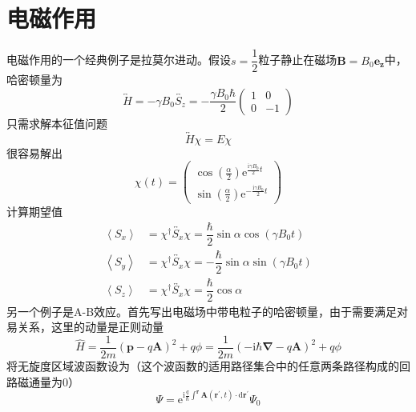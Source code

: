 \documentclass[12pt, a4paper, oneside]{ctexart}
\begin{document}
	\section{电磁作用}
	电磁作用的一个经典例子是拉莫尔进动。假设$s=\dfrac{1}{2}$粒子静止在磁场$\boldsymbol{B}=B_{0}\boldsymbol{e_{z}}$中，哈密顿量为
	\begin{equation}
		\overleftrightarrow{H}=-\gamma B_{0}\overleftrightarrow{S_{z}}=-\dfrac{\gamma B_{0}\hbar}{2}\begin{pmatrix}
			1	& 0\\
			0	&-1
		\end{pmatrix}
	\end{equation}
	\quad\quad 只需求解本征值问题
	\begin{equation}
		\overleftrightarrow{H}\chi=E\chi
	\end{equation}
	\quad\quad 很容易解出
	\begin{equation}
		\chi(t)=\begin{pmatrix}
		\cos(\frac{\alpha}{2})\mathrm{e}^{\frac{\mathrm{i}\gamma B_{0}}{2}t}	\\\sin(\frac{\alpha}{2})\mathrm{e}^{-\frac{\mathrm{i}\gamma B_{0}}{2}t}
		\end{pmatrix}
	\end{equation}
	\quad\quad 计算期望值
	\begin{align}
		\left<S_{x}\right>&=\chi^{\dagger}\overleftrightarrow{S_{x}}\chi=\dfrac{\hbar}{2}\sin\alpha\cos\left(\gamma B_{0}t\right)\\
		\left<S_{y}\right>&=\chi^{\dagger}\overleftrightarrow{S_{x}}\chi=-\dfrac{\hbar}{2}\sin\alpha\sin\left(\gamma B_{0}t\right)\\
		\left<S_{z}\right>&=\chi^{\dagger}\overleftrightarrow{S_{x}}\chi=\dfrac{\hbar}{2}\cos\alpha
	\end{align}
	\quad\quad 另一个例子是A-B效应。首先写出电磁场中带电粒子的哈密顿量，由于需要满足对易关系，这里的动量是正则动量
	\begin{equation}
		\hat{H}=\dfrac{1}{2m}\left(\boldsymbol{p}-q\boldsymbol{A}\right)^{2}+q\phi=\dfrac{1}{2m}\left(-\mathrm{i}\hbar\boldsymbol{\nabla}-q\boldsymbol{A}\right)^{2}+q\phi
	\end{equation}
	\quad\quad 将无旋度区域波函数设为（这个波函数的适用路径集合中的任意两条路径构成的回路磁通量为$0$）
	\begin{equation}
		\Psi=\mathrm{e}^{\mathrm{i}\frac{q}{\hbar}\int^{\boldsymbol{r}}\boldsymbol{A}(\boldsymbol{r^{\prime}},t)\cdot\mathrm{d}\boldsymbol{r^{\prime}}}\Psi_{0}
	\end{equation}
\end{document}
